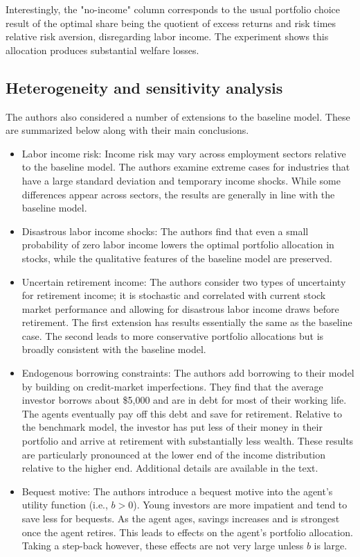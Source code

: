 \documentclass[./CGMPort.tex]{subfiles}
\begin{document}
Interestingly, the "no-income" column corresponds to the usual portfolio choice result of the optimal share being the quotient of excess returns and risk times relative risk aversion, disregarding labor income. The experiment shows this allocation produces substantial welfare losses.

\subsection{Heterogeneity and sensitivity analysis}

The authors also considered a number of extensions to the baseline model. These are summarized below along with their main conclusions.
\begin{itemize}
	\item Labor income risk: Income risk may vary across employment sectors relative to the baseline model. The authors examine extreme cases for industries that have a large standard deviation and temporary income shocks. While some differences appear across sectors, the results are generally in line with the baseline model.
	\item Disastrous labor income shocks: The authors find that even a small probability of zero labor income lowers the optimal portfolio allocation in stocks, while the qualitative features of the baseline model are preserved.
	\item Uncertain retirement income: The authors consider two types of uncertainty for retirement income; it is stochastic and correlated with current stock market performance and allowing for disastrous labor income draws before retirement. The first extension has results essentially the same as the baseline case. The second leads to more conservative portfolio allocations but is broadly consistent with the baseline model.
	\item Endogenous borrowing constraints: The authors add borrowing to their model by building on credit-market imperfections. They find that the average investor borrows about \$5,000 and are in debt for most of their working life. The agents eventually pay off this debt and save for retirement. Relative to the benchmark model, the investor has put less of their money in their portfolio and arrive at retirement with substantially less wealth. These results are particularly pronounced at the lower end of the income distribution relative to the higher end. Additional details are available in the text.
	\item Bequest motive: The authors introduce a bequest motive into the agent's utility function (i.e., $b>0$). Young investors are more impatient and tend to save less for bequests. As the agent ages, savings increases and is strongest once the agent retires. This leads to effects on the agent's portfolio allocation. Taking a step-back however, these effects are not very large unless $b$ is large.

\end{itemize}
\end{document}
